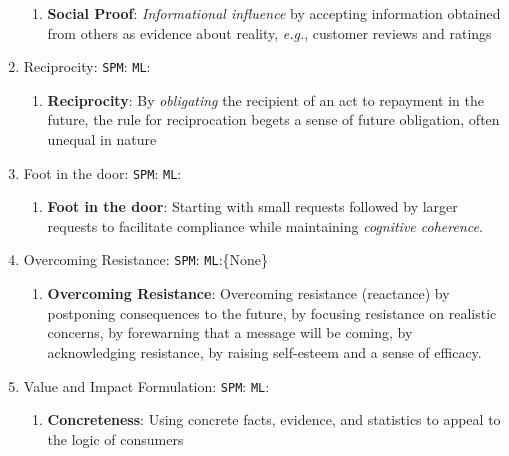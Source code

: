 \documentclass[hidelinks,11pt,a4paper]{report}
\renewcommand{\cite}[1]{\citep{#1}}
\begin{document}
\begin{enumerate}
\begin{enumerate}
        \item \textbf{Social Proof}: \textit{Informational influence} by accepting information obtained from others as evidence about reality, \textit{e.g.}, customer reviews and ratings 
    \end{enumerate}

    \item  Reciprocity: \texttt{SPM}:\cite{regan1971effects,cialdini2007influence,clark1984record,clark1979interpersonal,clark1986keeping} \texttt{ML}:\cite{anand2011believe,iyer2019unsupervised,althoff2014ask,ChenYang2021,shaikh-etal-2020-examining}
    \begin{enumerate}
        \item \textbf{Reciprocity}: By \textit{obligating} the recipient of an act to repayment in the future, the rule for reciprocation begets a sense of future obligation, often unequal in nature
    \end{enumerate}

    \item Foot in the door: \texttt{SPM}: \cite{freedman1966compliance,burger1999foot,cialdini2007influence} \texttt{ML}:\cite{chen2021weakly,wang-etal-2019-persuasion,vargheese2020exploring}
    \begin{enumerate}
        \item \textbf{Foot in the door}: Starting with small requests followed by larger requests to facilitate compliance while maintaining \textit{cognitive coherence}.
    \end{enumerate}

    \item  Overcoming Resistance: \texttt{SPM}:\cite{mcguire1961relative,knowles2004resistance,mcguire1964inducing} \texttt{ML}:\{None\}
    \begin{enumerate}
        \item \textbf{Overcoming Resistance}: Overcoming resistance (reactance) by postponing consequences to the future, by focusing resistance on realistic concerns, by forewarning that a message will be coming, by acknowledging resistance, by raising self-esteem and a sense of efficacy. 
    \end{enumerate}


    \item  Value and Impact Formulation: \texttt{SPM}:\cite{lee2010value,furnham2011literature,wegener2001implications,tversky1974judgment,strack1997explaining,bhattacharya2003consumer} \texttt{ML}:\cite{zhang2017characterizing,longpre2019persuasion}
    \begin{enumerate}
        \item \textbf{Concreteness}: Using concrete facts, evidence, and statistics to appeal to the logic of consumers 


\end{enumerate}
\end{enumerate}
\end{document}
